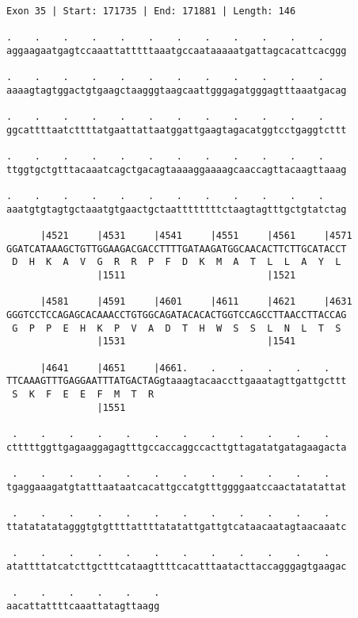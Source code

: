 \documentclass{article}
\begin{document}
\newpage
\begin{Verbatim}[fontfamily=courier]
Exon 35 | Start: 171735 | End: 171881 | Length: 146

.    .    .    .    .    .    .    .    .    .    .    .    
aggaagaatgagtccaaattatttttaaatgccaataaaaatgattagcacattcacggg

.    .    .    .    .    .    .    .    .    .    .    .    
aaaagtagtggactgtgaagctaagggtaagcaattgggagatgggagtttaaatgacag

.    .    .    .    .    .    .    .    .    .    .    .    
ggcattttaatcttttatgaattattaatggattgaagtagacatggtcctgaggtcttt

.    .    .    .    .    .    .    .    .    .    .    .    
ttggtgctgtttacaaatcagctgacagtaaaaggaaaagcaaccagttacaagttaaag

.    .    .    .    .    .    .    .    .    .    .    .    
aaatgtgtagtgctaaatgtgaactgctaattttttttctaagtagtttgctgtatctag

      |4521     |4531     |4541     |4551     |4561     |4571
GGATCATAAAGCTGTTGGAAGACGACCTTTTGATAAGATGGCAACACTTCTTGCATACCT
 D  H  K  A  V  G  R  R  P  F  D  K  M  A  T  L  L  A  Y  L 
                |1511                         |1521         

      |4581     |4591     |4601     |4611     |4621     |4631
GGGTCCTCCAGAGCACAAACCTGTGGCAGATACACACTGGTCCAGCCTTAACCTTACCAG
 G  P  P  E  H  K  P  V  A  D  T  H  W  S  S  L  N  L  T  S 
                |1531                         |1541         

      |4641     |4651     |4661.    .    .    .    .    .   
TTCAAAGTTTGAGGAATTTATGACTAGgtaaagtacaaccttgaaatagttgattgcttt
 S  K  F  E  E  F  M  T  R                                  
                |1551                                       

 .    .    .    .    .    .    .    .    .    .    .    .   
ctttttggttgagaaggagagtttgccaccaggccacttgttagatatgatagaagacta

 .    .    .    .    .    .    .    .    .    .    .    .   
tgaggaaagatgtatttaataatcacattgccatgtttggggaatccaactatatattat

 .    .    .    .    .    .    .    .    .    .    .    .   
ttatatatatagggtgtgttttattttatatattgattgtcataacaatagtaacaaatc

 .    .    .    .    .    .    .    .    .    .    .    .   
atattttatcatcttgctttcataagttttcacatttaatacttaccagggagtgaagac

 .    .    .    .    .    .
aacattattttcaaattatagttaagg
\end{Verbatim}
\end{document}
